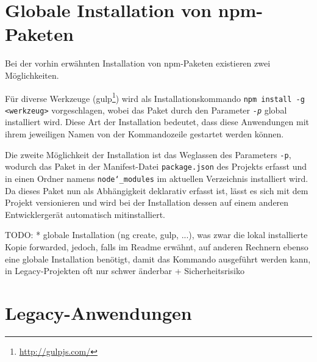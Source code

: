 \section{Globale Installation von npm-Paketen}
Bei der vorhin erwähnten Installation von npm-Paketen existieren zwei Möglichkeiten.

Für diverse Werkzeuge (\zB gulp\footnote{\url{http://gulpjs.com/}}) wird als Installationskommando \texttt{npm install -g <werkzeug>} vorgeschlagen, wobei das Paket durch den Parameter \emph{\texttt{-p}} global installiert wird.
Diese Art der Installation bedeutet, dass diese Anwendungen mit ihrem jeweiligen Namen von der Kommandozeile gestartet werden können.

Die zweite Möglichkeit der Installation ist das Weglassen des Parameters \texttt{-p}, wodurch das Paket in der Manifest-Datei \texttt{package.json} des Projekts erfasst und in einen Ordner namens \texttt{node\char`_modules} im aktuellen Verzeichnis installiert wird.
Da dieses Paket nun als Abhängigkeit deklarativ erfasst ist, lässt es sich mit dem Projekt versionieren und wird bei der Installation dessen auf einem anderen Entwicklergerät automatisch mitinstalliert.

TODO:
* globale Installation (ng create, gulp, ...), was zwar die lokal installierte Kopie forwarded, jedoch, falls im Readme erwähnt, auf anderen Rechnern ebenso eine globale Installation benötigt, damit das Kommando ausgeführt werden kann, in Legacy-Projekten oft nur schwer änderbar + Sicherheitsrisiko


\section{Legacy-Anwendungen}
\label{sec:legacy-applications}
